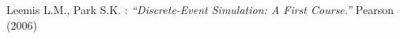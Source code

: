 \newpage
\begin{thebibliography}{99}

 Leemis L.M., Park S.K. :
\emph{``Discrete-Event Simulation: A First Course.''}
 Pearson (2006)
\end{thebibliography}
